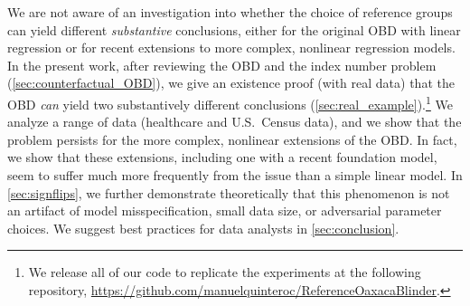 We are not aware of an investigation into whether the choice of reference groups can yield different \emph{substantive} conclusions, either
for the original OBD with linear regression or for recent extensions to more complex, nonlinear regression models.
In the present work, after reviewing the OBD and the index number problem (\cref{sec:counterfactual_OBD}), we 
give an existence proof (with real data) that the OBD \emph{can} yield two substantively different conclusions (\cref{sec:real_example}).\footnote{We release all of our code to replicate the experiments at the following repository, \url{https://github.com/manuelquinteroc/ReferenceOaxacaBlinder}.}
We analyze a range of data (healthcare and U.S.\ Census data), and we show that the problem persists for the more complex, nonlinear extensions of the OBD.
In fact, we show that these extensions, including one with a recent foundation model, seem to suffer much more frequently from the issue than
a simple linear model.
In \cref{sec:signflips}, we further demonstrate theoretically that this phenomenon is not an artifact of 
model misspecification, small data size, or adversarial parameter choices.
We suggest best practices for data analysts in \cref{sec:conclusion}.












